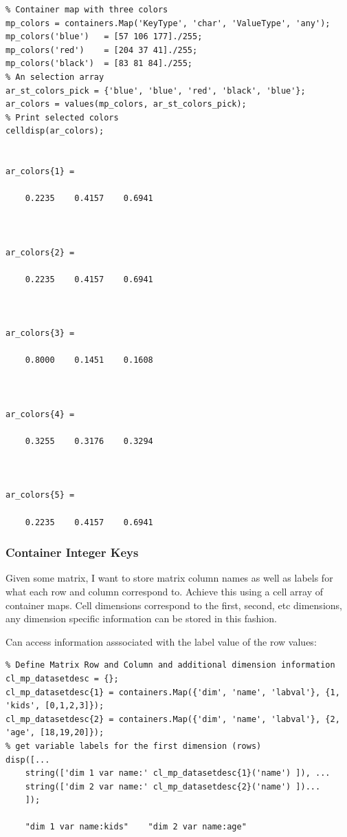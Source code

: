 \documentclass[
]{book}
\begin{document}
\begin{verbatim}
% Container map with three colors
mp_colors = containers.Map('KeyType', 'char', 'ValueType', 'any');
mp_colors('blue')   = [57 106 177]./255;
mp_colors('red')    = [204 37 41]./255;
mp_colors('black')  = [83 81 84]./255;
% An selection array
ar_st_colors_pick = {'blue', 'blue', 'red', 'black', 'blue'};
ar_colors = values(mp_colors, ar_st_colors_pick);
% Print selected colors
celldisp(ar_colors);


ar_colors{1} =
 
    0.2235    0.4157    0.6941



ar_colors{2} =
 
    0.2235    0.4157    0.6941



ar_colors{3} =
 
    0.8000    0.1451    0.1608



ar_colors{4} =
 
    0.3255    0.3176    0.3294



ar_colors{5} =
 
    0.2235    0.4157    0.6941
\end{verbatim}

\hypertarget{container-integer-keys}{%
\subsubsection{Container Integer Keys}\label{container-integer-keys}}

Given some matrix, I want to store matrix column names as well as labels
for what each row and column correspond to. Achieve this using a cell
array of container maps. Cell dimensions correspond to the first,
second, etc dimensions, any dimension specific information can be stored
in this fashion.

Can access information asssociated with the label value of the row
values:

\begin{verbatim}
% Define Matrix Row and Column and additional dimension information
cl_mp_datasetdesc = {};
cl_mp_datasetdesc{1} = containers.Map({'dim', 'name', 'labval'}, {1, 'kids', [0,1,2,3]});
cl_mp_datasetdesc{2} = containers.Map({'dim', 'name', 'labval'}, {2, 'age', [18,19,20]});
% get variable labels for the first dimension (rows)
disp([...
    string(['dim 1 var name:' cl_mp_datasetdesc{1}('name') ]), ...
    string(['dim 2 var name:' cl_mp_datasetdesc{2}('name') ])...
    ]);

    "dim 1 var name:kids"    "dim 2 var name:age"
\end{verbatim}
\end{document}

